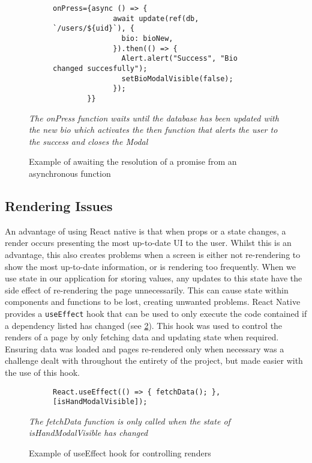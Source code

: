 \begin{figure}[!htbp]
    \centering
    \begin{subfigure}[b]{0.8\textwidth}
        \begin{lstlisting}[language=jsJsx]
        onPress={async () => {
              await update(ref(db, `/users/${uid}`), {
                bio: bioNew,
              }).then(() => {
                Alert.alert("Success", "Bio changed succesfully");
                setBioModalVisible(false);
              });
        }}
        \end{lstlisting}
    \end{subfigure}
\caption{Example of awaiting the resolution of a promise from an asynchronous function}
\small\textit{The onPress function waits until the database has been updated with the new bio which activates the then function that alerts the user to the success and closes the Modal}
\label{fig:asyncAwait}
\end{figure}
\FloatBarrier

\subsection*{Rendering Issues}
An advantage of using React native is that when props or a state changes, a render occurs presenting the most up-to-date UI to the user. Whilst this is an advantage, this also creates problems when a screen is either not re-rendering to show the most up-to-date information, or is rendering too frequently. When we use state in our application for storing values, any updates to this state have the side effect of re-rendering the page unnecessarily. This can cause state within components and functions to be lost, creating unwanted problems. React Native provides a \texttt{useEffect} hook that can be used to only execute the code contained if a dependency listed has changed (see \ref{fig:useEffect}). This hook was used to control the renders of a page by only fetching data and updating state when required. Ensuring data was loaded and pages re-rendered only when necessary was a challenge dealt with throughout the entirety of the project, but made easier with the use of this hook.
\begin{figure}[!htbp]
    \centering
    \begin{subfigure}[b]{0.8\textwidth}
        \begin{lstlisting}[language=jsJsx]
        React.useEffect(() => { fetchData(); }, [isHandModalVisible]);
        \end{lstlisting}
    \end{subfigure}
\caption{Example of useEffect hook for controlling renders}
\small\textit{The fetchData function is only called when the state of isHandModalVisible has changed}
\label{fig:useEffect}
\end{figure}
\FloatBarrier

